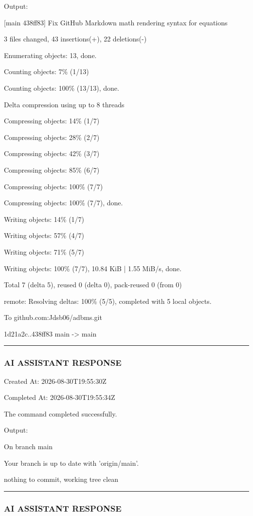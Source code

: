 \documentclass[11pt,a4paper]{article}
\begin{document}
{Output:

[main 438ff83] Fix GitHub Markdown math rendering syntax for equations

3 files changed, 43 insertions(+), 22 deletions(-)

Enumerating objects: 13, done.

Counting objects:   7\% (1/13)

Counting objects: 100\% (13/13), done.

Delta compression using up to 8 threads

Compressing objects:  14\% (1/7)

Compressing objects:  28\% (2/7)

Compressing objects:  42\% (3/7)

Compressing objects:  85\% (6/7)

Compressing objects: 100\% (7/7)

Compressing objects: 100\% (7/7), done.

Writing objects:  14\% (1/7)

Writing objects:  57\% (4/7)

Writing objects:  71\% (5/7)

Writing objects: 100\% (7/7), 10.84 KiB | 1.55 MiB/s, done.

Total 7 (delta 5), reused 0 (delta 0), pack-reused 0 (from 0)

remote: Resolving deltas: 100\% (5/5), completed with 5 local objects.

To github.com:Jdsb06/adbms.git

1d21a2c..438ff83  main -> main


\hrule

\subsubsection{AI ASSISTANT RESPONSE}

Created At: 2026-08-30T19:55:30Z

Completed At: 2026-08-30T19:55:34Z


The command completed successfully.

Output:

On branch main

Your branch is up to date with 'origin/main'.


nothing to commit, working tree clean


\hrule

\subsubsection{AI ASSISTANT RESPONSE}

}
\end{document}

